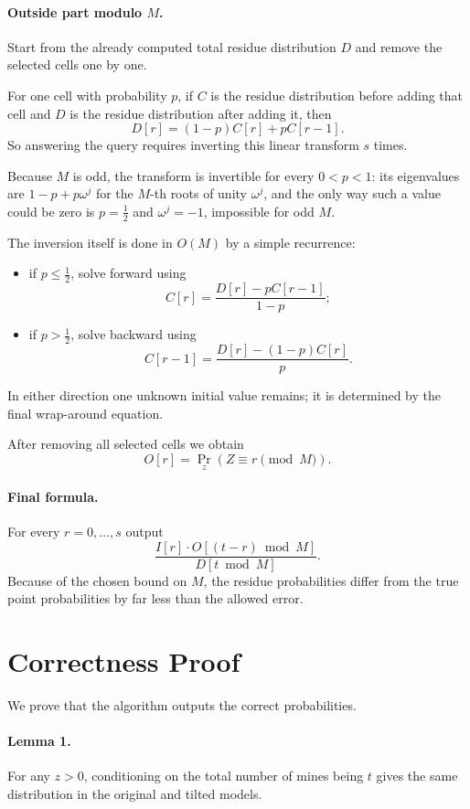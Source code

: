 \documentclass[11pt]{article}
\begin{document}
\paragraph{Outside part modulo $M$.}
Start from the already computed total residue distribution $D$ and remove the selected cells one by one.

For one cell with probability $p$, if $C$ is the residue distribution before adding that cell and $D$ is the residue
distribution after adding it, then
\[
    D[r]=(1-p)C[r]+pC[r-1].
\]
So answering the query requires inverting this linear transform $s$ times.

Because $M$ is odd, the transform is invertible for every $0<p<1$:
its eigenvalues are $1-p+p\omega^j$ for the $M$-th roots of unity $\omega^j$, and the only way such a value could be
zero is $p=\tfrac12$ and $\omega^j=-1$, impossible for odd $M$.

The inversion itself is done in $O(M)$ by a simple recurrence:
\begin{itemize}[leftmargin=*]
    \item if $p\le \tfrac12$, solve forward using
    \[
        C[r]=\frac{D[r]-pC[r-1]}{1-p};
    \]
    \item if $p> \tfrac12$, solve backward using
    \[
        C[r-1]=\frac{D[r]-(1-p)C[r]}{p}.
    \]
\end{itemize}
In either direction one unknown initial value remains; it is determined by the final wrap-around equation.

After removing all selected cells we obtain
\[
    O[r]=\Pr_z(Z\equiv r \pmod M).
\]

\paragraph{Final formula.}
For every $r=0,\dots,s$ output
\[
    \frac{I[r]\cdot O[(t-r)\bmod M]}{D[t\bmod M]}.
\]
Because of the chosen bound on $M$, the residue probabilities differ from the true point probabilities by far less than
the allowed error.

\section*{Correctness Proof}

We prove that the algorithm outputs the correct probabilities.

\paragraph{Lemma 1.}
For any $z>0$, conditioning on the total number of mines being $t$ gives the same distribution in the original and
tilted models.
\end{document}
